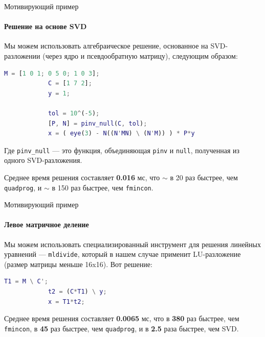 \documentclass{beamer}
\begin{document}
\begin{frame}[fragile]{Мотивирующий пример}
	\framesubtitle{Решение на основе SVD}
	\begin{flushleft}
		
		Мы можем использовать алгебраическое решение, основанное на SVD-разложении (через ядро и псевдообратную матрицу), следующим образом:
		
		\begin{lstlisting}[language=Matlab]
			M = [1 0 1; 0 5 0; 1 0 3];
			C = [1 7 2];
			y = 1;
			
			tol = 10^(-5);
			[P, N] = pinv_null(C, tol);
			x = ( eye(3) - N((N'MN) \ (N'M)) ) * P*y
		\end{lstlisting}
		
		Где \texttt{pinv\_null} — это функция, объединяющая \texttt{pinv} и \texttt{null}, полученная из одного SVD-разложения.
		
		Среднее время решения составляет \textbf{0.016} мс, что $\sim$ в 20 раз быстрее, чем \texttt{quadprog}, и $\sim$ в 150 раз быстрее, чем \texttt{fmincon}.
		
	\end{flushleft}
\end{frame}

\begin{frame}[fragile]{Мотивирующий пример}
	\framesubtitle{Левое матричное деление}
	\begin{flushleft}
		
		Мы можем использовать специализированный инструмент для решения линейных уравнений — \texttt{mldivide}, который в нашем случае применит LU-разложение (размер матрицы меньше 16x16). Вот решение:
		
		\begin{lstlisting}[language=Matlab]
			T1 = M \ C';
			t2 = (C*T1) \ y;
			x = T1*t2;
		\end{lstlisting}
		
		Среднее время решения составляет \textbf{0.0065} мс, что в \textbf{380} раз быстрее, чем \texttt{fmincon}, в \textbf{45} раз быстрее, чем \texttt{quadprog}, и в \textbf{2.5} раза быстрее, чем SVD.
		
	\end{flushleft}
\end{frame}
\end{document}
